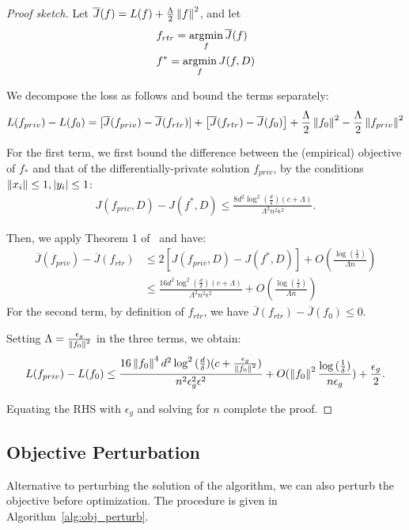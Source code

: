 \documentclass{article} %
\begin{document}
\begin{proof}[Proof sketch]
Let $\overline{J}(f) = L(f) + \frac{\Lambda}{2} \left\lVert f\right\rVert^2$, and let \begin{align*}
& f_{rtr} = \operatorname*{argmin}_f \overline{J}(f)\\
& f^* = \operatorname*{argmin}_f J(f, D)
\end{align*}

We decompose the loss as follows and bound the terms separately:
\begin{align*}
L(f_{priv}) -  L(f_0) = [\overline{J}(f_{priv}) - \overline{J}(f_{rtr})] + \left[\overline{J}(f_{rtr}) - \overline{J}(f_0)\right] + \frac{\Lambda}{2} \left\lVert f_0\right\rVert^2 - \frac{\Lambda}{2} \left\lVert f_{priv}\right\rVert^2
\end{align*}

For the first term, we first bound the difference between the (empirical) objective of $f_*$ and that of the differentially-private solution $f_{priv}$, by the conditions $\left\lVert x_i\right\rVert \le 1, \left\lvert y_i\right\rvert \le 1$:
\begin{align}
J(f_{priv}, D) - J(f^*, D) \le \frac{8d^2\log^2{(\frac{d}{\delta})} (c + \Lambda)}{\Lambda^2 n^2 \epsilon^2}.\label{thm15:emp}
\end{align}

Then, we apply Theorem 1 of~\cite{sridharan2008objective} and have:
\begin{align*}
\overline{J}(f_{priv}) - \overline{J}(f_{rtr}) & \le 2 [J(f_{priv}, D) - J(f^*, D)] + O(\frac{\log{(\frac{1}{\delta})}}{\Lambda n})\\
& \le  \frac{16d^2\log^2{(\frac{d}{\delta})} (c + \Lambda)}{\Lambda^2 n^2 \epsilon^2} + O(\frac{\log{(\frac{1}{\delta})}}{\Lambda n})
\end{align*}
For the second term, by definition of $f_{rtr}$, we have $\overline{J}(f_{rtr}) - \overline{J}(f_0) \le 0$.

Setting $\Lambda = \frac{\epsilon_g}{\left\lVert f_0\right\rVert^2}$ in the three terms, we obtain:
\begin{align*}
L(f_{priv}) - L(f_0) \le  \frac{16\left\lVert f_0\right\rVert^4 d^2\log^2{(\frac{d}{\delta})} (c +\frac{\epsilon_g}{\left\lVert f_0\right\rVert^2})}{n^2 \epsilon_g^2\epsilon^2} + O(\left\lVert f_0\right\rVert^2\frac{\log{(\frac{1}{\delta})}}{n\epsilon_g}) + \frac{\epsilon_g}{2}.
\end{align*}

Equating the RHS with $\epsilon_g$ and solving for $n$ complete the proof.
\end{proof}

\subsection{Objective Perturbation}
Alternative to perturbing the solution of the algorithm, we can also perturb the objective before optimization. The procedure is given in Algorithm~\ref{alg:obj_perturb}.
\end{document}
